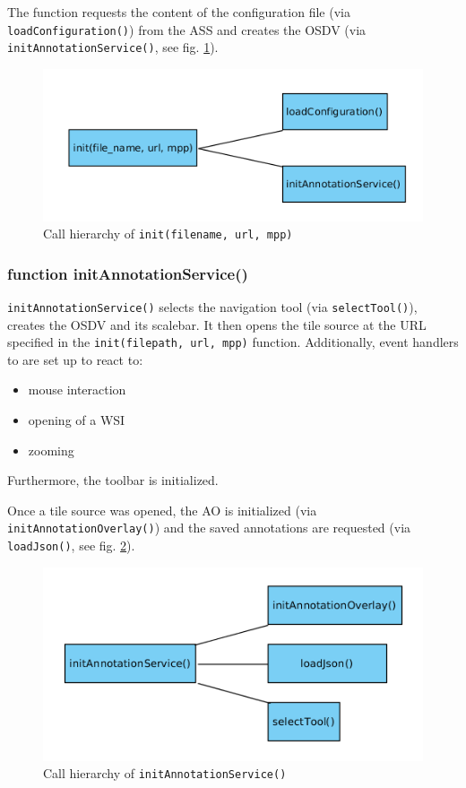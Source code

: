 The function requests the content of the configuration file (via \texttt{loadConfiguration()}) from the ASS and creates the OSDV (via \texttt{initAnnotationService()}, see fig. \ref{figB_init}).

\begin{figure}[H]
	\begin{center}
		\includegraphics[scale=0.5]{img/ch_init.png}
		\caption{Call hierarchy of \texttt{init(file{\textunderscore}name, url, mpp)}}
		\label{figB_init}
	\end{center}
\end{figure}


\subsubsection{function initAnnotationService()}
\texttt{initAnnotationService()} selects the navigation tool (via \texttt{selectTool()}), creates the OSDV and its scalebar. It then opens the tile source at the URL specified in the \texttt{init(file{\textunderscore}path, url, mpp)} function. Additionally, event handlers to are set up to react to:
\begin{itemize}
	\item mouse interaction
	\item opening of a WSI
	\item zooming
\end{itemize}
Furthermore, the toolbar is initialized.

Once a tile source was opened, the AO is initialized (via \texttt{initAnnotationOverlay()}) and the saved annotations are requested (via \texttt{loadJson()}, see fig. \ref{figB_initAS}).

\begin{figure}[H]
	\begin{center}
		\includegraphics[scale=0.5]{img/ch_initAS.png}
		\caption{Call hierarchy of \texttt{initAnnotationService()}}
		\label{figB_initAS}
	\end{center}
\end{figure}


